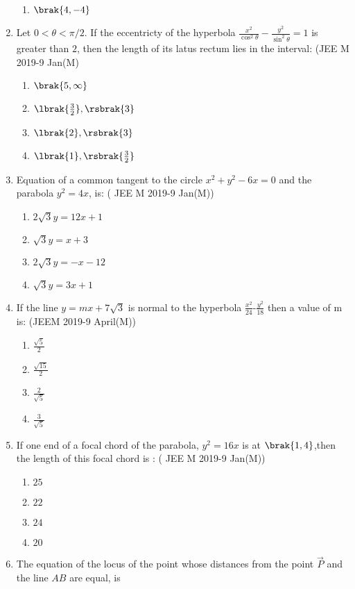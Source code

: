 \begin{enumerate}
\begin{enumerate}
    		\item $\brak{4,-4}$
	\end{enumerate}
\item Let $0<\theta<\pi/2$. If the eccentricty of the hyperbola $\frac{x^2}{\cos^2{\theta}} - \frac{y^2}{\sin^2{\theta}} = 1$ is greater than $2$, then the length of its latus rectum lies in the interval:
          \hfill{(JEE M 2019-9 Jan(M)}
	\begin{enumerate}
    		\item $\brak{5,\infty}$
    		\item $\lbrak{\frac{3}{2}},\rsbrak{3}$
    		\item $\lbrak{2},\rsbrak{3}$ 
    		\item $\lbrak{1},\rsbrak{\frac{3}{2}}$
	\end{enumerate} 
\item Equation of a common tangent to the circle $x^2+y^2-6x=0$ and the parabola $y^2=4x$, is:
     \hfill{( JEE M 2019-9 Jan(M))}
	\begin{enumerate}
    		\item $2\sqrt{3}y=12x+1$ 
    		\item $\sqrt{3}y=x+3$
    		\item $2\sqrt{3}y=-x-12$ 
    		\item $\sqrt{3}y=3x+1$
	\end{enumerate}   
\item If the line $y=mx+7\sqrt{3}$ is normal to the hyperbola $\frac{x^2}{24}$-$\frac{y^2}{18}$ then a value of m is: 
     \hfill{(JEEM 2019-9 April(M))}
	\begin{enumerate}
    		\item $\frac{\sqrt{5}}{2}$ 
    		\item $\frac{\sqrt{15}}{2}$
    		\item $\frac{2}{\sqrt5}$
    		\item $\frac{3}{\sqrt5}$
	\end{enumerate}
\item If one end of a focal chord of the parabola, $y^2=16x$ is at $\brak{1,4}$,then the length of this focal chord is :
     \hfill{( JEE M 2019-9 Jan(M))}
	\begin{enumerate}
    		\item $25$
    		\item $22$
    		\item $24$
    		\item $20$
	\end{enumerate}    
\item  The equation of the locus of the point whose distances from the point $\Vec{P}$ and the line $AB$ are equal, is
\end{enumerate}

